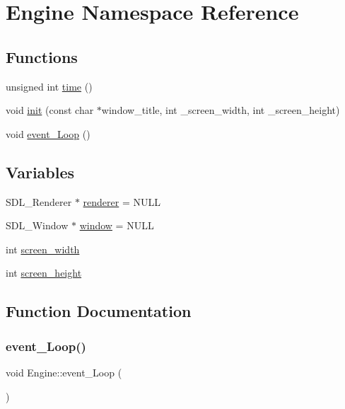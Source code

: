 \hypertarget{namespace_engine}{}\section{Engine Namespace Reference}
\label{namespace_engine}
\subsection*{Functions}
\begin{DoxyCompactItemize}
\item 
unsigned int \mbox{\hyperlink{namespace_engine_adf0a70bcfb4c022242c96d53458d5f19}{time}} ()
\item 
void \mbox{\hyperlink{namespace_engine_a3c724ad52a22ba7fe7a6644171c35876}{init}} (const char $\ast$window\+\_\+title, int \+\_\+screen\+\_\+width, int \+\_\+screen\+\_\+height)
\item 
void \mbox{\hyperlink{namespace_engine_abe7b628a87c18e79898f4d165558fb68}{event\+\_\+\+Loop}} ()
\end{DoxyCompactItemize}
\subsection*{Variables}
\begin{DoxyCompactItemize}
\item 
S\+D\+L\+\_\+\+Renderer $\ast$ \mbox{\hyperlink{namespace_engine_ad2484a396a99c02dc8c8b273bd189a7b}{renderer}} = N\+U\+LL
\item 
S\+D\+L\+\_\+\+Window $\ast$ \mbox{\hyperlink{namespace_engine_a259fae393fddd68428a2c504cf633670}{window}} = N\+U\+LL
\item 
int \mbox{\hyperlink{namespace_engine_a64e14e02ad1bcecdf5b58780b3c673b8}{screen\+\_\+width}}
\item 
int \mbox{\hyperlink{namespace_engine_a1386e582efc54cf5d9074e2dce5f259b}{screen\+\_\+height}}
\end{DoxyCompactItemize}


\subsection{Function Documentation}
\mbox{\label{namespace_engine_abe7b628a87c18e79898f4d165558fb68}} 
\subsubsection{\texorpdfstring{event\+\_\+\+Loop()}{event\_Loop()}}
{\footnotesize\ttfamily void Engine\+::event\+\_\+\+Loop (\begin{DoxyParamCaption}{ }\end{DoxyParamCaption})}

